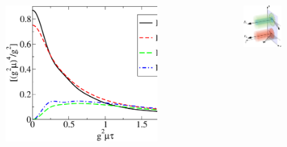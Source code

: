 \documentclass[aspectratio=169,11pt,usenames,dvipsnames]{beamer}
\begin{document}
\begin{frame}
\begin{columns}[onlytextwidth,t]
        \begin{center}
            \begin{figure}
                \centering
                \hspace{-5pt}\includegraphics[width=0.9\textwidth]{images/components.eps}
            \end{figure}
        \end{center}

        \begin{center}
            \begin{figure}
                \centering
                \includegraphics[width=0.7\textwidth]{images/1-s2.0-S0370269320306134-gr003_lrg.jpg}
            \end{figure}
        \end{center}


\end{columns}
\end{frame}
\end{document}
